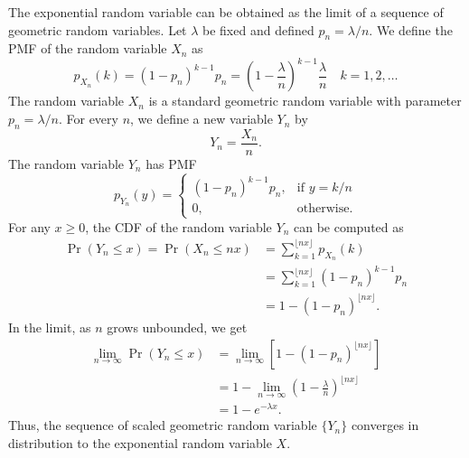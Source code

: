 The exponential random variable can be obtained as the limit of a sequence of geometric random variables.
Let $\lambda$ be fixed and defined $p_n = \lambda/n$.
We define the PMF of the random variable $X_n$ as
\begin{equation*}
p_{X_n} (k) = (1 - p_n)^{k-1} p_n
= \left( 1 - \frac{\lambda}{n} \right)^{k-1} \frac{\lambda}{n}
\quad k = 1, 2, \ldots
\end{equation*}
The random variable $X_n$ is a standard geometric random variable with parameter $p_n = \lambda/n$.
For every $n$, we define a new variable $Y_n$ by
\begin{equation*}
Y_n = \frac{X_n}{n}.
\end{equation*}
The random variable $Y_n$ has PMF
\begin{equation*}
p_{Y_n} (y) = \left\{ \begin{array}{ll}
(1 - p_n)^{k-1} p_n, & \text{if }y = k/n \\
0, & \text{otherwise} .
\end{array} \right.
\end{equation*}
For any $x \geq 0$, the CDF of the random variable $Y_n$ can be computed as
\begin{equation*}
\begin{split}
\Pr (Y_n \leq x)
= \Pr (X_n \leq n x)
&= \sum_{k = 1}^{\lfloor n x \rfloor} p_{X_n} (k) \\
&= \sum_{k = 1}^{\lfloor n x \rfloor} (1 - p_n)^{k-1} p_n \\
&= 1 - (1 - p_n)^{\lfloor n x \rfloor} .
\end{split}
\end{equation*}
In the limit, as $n$ grows unbounded, we get
\begin{equation*}
\begin{split}
\lim_{n \rightarrow \infty} \Pr (Y_n \leq x)
&= \lim_{n \rightarrow \infty} \left[ 1 - (1 - p_n)^{\lfloor n x \rfloor} \right] \\
&= 1 - \lim_{n \rightarrow \infty}
\left( 1 - \frac{\lambda}{n} \right)^{\lfloor n x \rfloor} \\
&= 1 - e^{- \lambda x} .
\end{split}
\end{equation*}
Thus, the sequence of scaled geometric random variable $\{ Y_n \}$ converges in distribution to the exponential random variable $X$.


